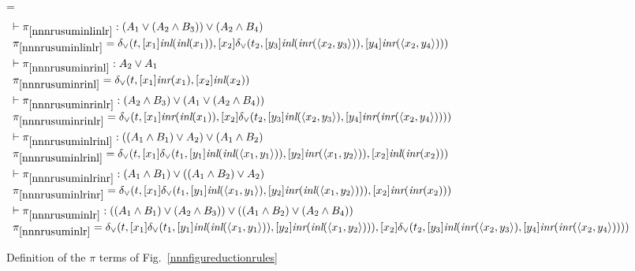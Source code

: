 \documentclass[screen, sigconf,authorversion,nonacm]{acmart}
\theoremstyle{acmdefinition}
\numberwithin{equation}{section}
\newcommand\abstr[1]{[#1]}
\newcommand\inl{\mbox{\it inl}}
\newcommand\inr{\mbox{\it inr}}
\newcommand\elimor{\delta_{\vee}}
\newcommand\pair[2]{\langle #1, #2 \rangle}
\begin{document}
\begin{figure*}[!ht]
  \centering
  \columnwidth=\linewidth
  \[
    \begin{array}{l}
      \vdash\pi_{\ref{nnnrusuminlinlr}}:
      (A_1 \vee (A_2 \wedge B_3)) \vee (A_2 \wedge B_4)\\
      \pi_{\ref{nnnrusuminlinlr}} = 
	\elimor(t,
	  \abstr{x_1}\inl(\inl(x_1)),
	\abstr{x_2}\elimor(t_2,\abstr{y_3}\inl(\inr(\pair{x_2}{y_3})), \abstr{y_4}\inr(\pair{x_2}{y_4})))
	\\[1.5ex]
      \vdash\pi_{\ref{nnnrusuminrinl}}:A_2 \vee A_1\\
      \pi_{\ref{nnnrusuminrinl}}=
	\elimor(t,\abstr{x_1} \inr(x_1),
	\abstr{x_2} \inl(x_2))
	\\[1.5ex]
      \vdash\pi_{\ref{nnnrusuminrinlr}}:(A_2 \wedge B_3) \vee (A_1 \vee (A_2 \wedge B_4))\\
      \pi_{\ref{nnnrusuminrinlr}}= 
	\elimor(t,
	  \abstr{x_1}\inr(\inl(x_1)),
	\abstr{x_2}\elimor(t_2,\abstr{y_3}\inl(\pair{x_2}{y_3}), \abstr{y_4}\inr(\inr(\pair{x_2}{y_4}))))
      \\[1.5ex]
      \vdash\pi_{\ref{nnnrusuminlrinl}}:((A_1 \wedge B_1)\vee A_2) \vee (A_1 \wedge B_2)\\
      \pi_{\ref{nnnrusuminlrinl}}=
	\elimor(t,
	  \abstr{x_1}\elimor(t_1,\abstr{y_1}\inl(\inl(\pair{x_1}{y_1})), \abstr{y_2}\inr(\pair{x_1}{y_2})),
	\abstr{x_2}\inl(\inr(x_2)))
      \\[1.5ex]
      \vdash\pi_{\ref{nnnrusuminlrinr}}:(A_1 \wedge B_1) \vee ((A_1 \wedge B_2) \vee A_2)\\
      \pi_{\ref{nnnrusuminlrinr}}= 
	\elimor(t,
	  \abstr{x_1}\elimor(t_1,\abstr{y_1}\inl(\pair{x_1}{y_1}),\abstr{y_2}\inr(\inl(\pair{x_1}{y_2}))),
	\abstr{x_2}\inr(\inr(x_2)))
      \\[1.5ex]
      \vdash\pi_{\ref{nnnrusuminlr}}:((A_1 \wedge B_1) \vee (A_2 \wedge B_3)) \vee ((A_1 \wedge B_2) \vee (A_2 \wedge B_4))\\
      \pi_{\ref{nnnrusuminlr}}= 
	\elimor(t,
	  [x_1]\elimor(t_1,[y_1]\inl(\inl(\pair{x_1}{y_1})), [y_2]\inr(\inl(\pair{x_1}{y_2}))),
	  [x_2]\elimor(t_2,[y_3]\inl(\inr(\pair{x_2}{y_3}), [y_4]\inr(\inr(\pair{x_2}{y_4}))))
      \end{array}
    \]
    \caption{Definition of the $\pi$ terms of Fig.~\ref{nnnfigureductionrules}\label{nnnfigurepi}}
\end{figure*}
\end{document}
